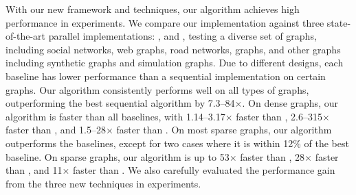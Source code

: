 
With our new framework and techniques, our algorithm achieves high performance in experiments. 
We compare our implementation against three state-of-the-art parallel implementations: \Julienne{}, \Park{} and \PKC{}, 
testing a diverse set of graphs, including social networks, web graphs, road networks, \KNN graphs, and other graphs including synthetic graphs and simulation graphs. 
Due to different designs, each baseline has lower performance than a sequential implementation on certain graphs. 
Our algorithm consistently performs well on all types of graphs, 
outperforming the best sequential algorithm by 7.3--84$\times$.
On dense graphs, 
our algorithm is faster than all baselines, 
with 1.14--3.17$\times$ faster than \Julienne{}, 2.6--315$\times$ faster than \Park{}, and 1.5--28$\times$ faster than \PKC{}.
On most sparse graphs, our algorithm outperforms the baselines, except for two cases where it is within 12\% of the best baseline.
On sparse graphs, our algorithm is up to 53$\times$ faster than \Julienne{}, 28$\times$ faster than \Park{}, and 11$\times$ faster than \PKC{}. 
We also carefully evaluated the performance gain from the three new techniques in experiments. 

